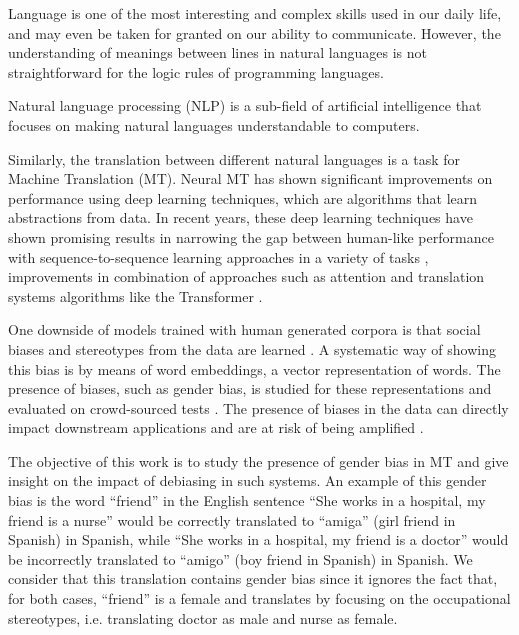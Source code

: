 \documentclass[11pt,a4paper]{article}
\begin{document}
Language is one of the most interesting and complex skills used in our daily life, and may even be taken for granted on our ability to communicate. However, the understanding of meanings between lines in natural languages is not straightforward for the logic rules of programming languages. 

Natural language processing (NLP) is a sub-field of artificial intelligence that focuses on making natural languages understandable to computers. 

Similarly, the translation between different natural languages is a task for Machine Translation (MT). Neural MT has shown significant improvements on performance using deep learning techniques, which are algorithms that learn abstractions from data. In recent years, these deep learning techniques have shown promising results in narrowing the gap between human-like performance with sequence-to-sequence learning approaches in a variety of tasks \cite{sutskever2014}, improvements in combination of approaches such as attention \cite{DBLP:journals/corr/BahdanauCB14} and translation systems algorithms like the Transformer \cite{vaswani2017}.

One downside of models trained with human generated corpora is that social biases and stereotypes from the data are learned \cite{madaan}. A systematic way of showing this bias is by means of word embeddings, a vector representation of words.
The presence of biases, such as gender bias, is studied for these representations and evaluated on crowd-sourced tests \cite{bolukbasi2016}.
The presence of biases in the data can directly impact downstream applications \cite{DBLP:conf/naacl/ZhaoWYOC18} and are at risk of being amplified \cite{DBLP:conf/emnlp/ZhaoWYOC17}.




The objective of this work is to study the presence of gender bias in MT and give insight on the impact of debiasing in such systems. An example of this gender bias is the word ``friend'' in the English sentence ``She works in a hospital, my friend is a nurse'' would be correctly translated to ``amiga'' (girl friend in Spanish) in Spanish, while ``She works in a hospital, my friend is a doctor'' would be incorrectly translated to ``amigo'' (boy friend in Spanish) in Spanish. We consider that this translation contains gender bias since it ignores the fact that, for both cases, ``friend'' is a female and translates by focusing on the occupational stereotypes, i.e. translating doctor as male and nurse as female. 
\end{document}

